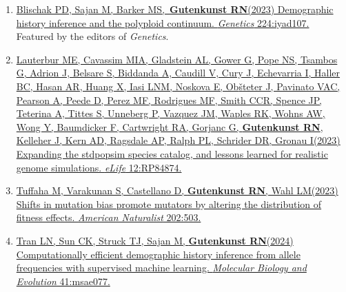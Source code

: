 \documentclass[11pt]{article}
\begin{document}
\begin{enumerate}
\item \href{https://doi.org/10.1093/genetics/iyad107}{Blischak PD\trainee\corresponding, Sajan M\trainee, Barker MS, \textbf{Gutenkunst RN}\corresponding (2023) Demographic history inference and the polyploid continuum. \emph{Genetics} 224:iyad107.}\\
 Featured by the editors of \emph{Genetics}.

\item \href{https://doi.org/10.7554/eLife.84874}{Lauterbur ME\equal, Cavassim MIA\equal, Gladstein AL\equal, Gower G\equal, Pope NS\equal, Tsambos G\equal, Adrion J, Belsare S, Biddanda A, Caudill V, Cury J, Echevarria I, Haller BC, Hasan AR, Huang X, Iasi LNM, Noskova E, Ob{\v s}teter J, Pavinato VAC, Pearson A, Peede D, Perez MF, Rodrigues MF, Smith CCR, Spence JP, Teterina A, Tittes S, Unneberg P, Vazquez JM, Waples RK, Wohns AW, Wong Y, Baumdicker F, Cartwright RA, Gorjanc G, \textbf{Gutenkunst RN}, Kelleher J, Kern AD, Ragsdale AP, Ralph PL, Schrider DR, Gronau I\corresponding (2023) Expanding the stdpopsim species catalog, and lessons learned for realistic genome simulations. \emph{eLife} 12:RP84874.}

\item \href{https://doi.org/10.1086/726010}{Tuffaha M, Varakunan S, Castellano D\trainee, \textbf{Gutenkunst RN}, Wahl LM\corresponding (2023) Shifts in mutation bias promote mutators by altering the distribution of fitness effects. \emph{American Naturalist} 202:503.}

\item \href{https://doi.org/10.1093/molbev/msae077}{Tran LN\trainee, Sun CK\trainee, Struck TJ\trainee, Sajan M\trainee, \textbf{Gutenkunst RN}\corresponding (2024) Computationally efficient demographic history inference from allele frequencies with supervised machine learning. \emph{Molecular Biology and Evolution} 41:msae077.}

\end{enumerate}
\end{document}
